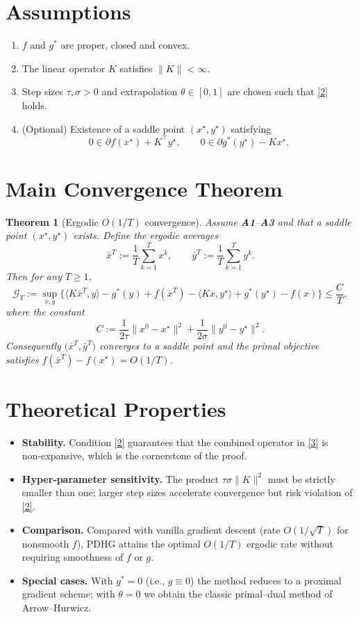 \documentclass{article}
\newtheorem{theorem}{Theorem}
\begin{document}
\section*{Assumptions}
\begin{enumerate}
\item[\textbf{A1}] $f$ and $g^{*}$ are proper, closed and convex.
\item[\textbf{A2}] The linear operator $K$ satisfies $\|K\|<\infty$.
\item[\textbf{A3}] Step sizes $\tau,\sigma>0$ and extrapolation $\theta\in[0,1]$ are chosen such that \eqref{2} holds.
\item[\textbf{A4}] (Optional) Existence of a saddle point $(x^{\star},y^{\star})$ satisfying
\[
0\in\partial f(x^{\star})+K^{\top}y^{\star},
\qquad
0\in\partial g^{*}(y^{\star})-Kx^{\star}.
\]
\end{enumerate}

\section*{Main Convergence Theorem}
\begin{theorem}[Ergodic $O(1/T)$ convergence]\label{thm:main}
Assume \textbf{A1}–\textbf{A3} and that a saddle point $(x^{\star},y^{\star})$ exists.  
Define the ergodic averages
\[
\bar x^{T}:=\frac{1}{T}\sum_{k=1}^{T}x^{k},
\qquad
\bar y^{T}:=\frac{1}{T}\sum_{k=1}^{T}y^{k}.
\]
Then for any $T\ge 1$,
\[
\mathcal G_{T}:=
\sup_{x,y}\Big\{\langle K\bar x^{T},y\rangle-g^{*}(y)+f(\bar x^{T})
          -\langle Kx,y^{\star}\rangle+g^{*}(y^{\star})-f(x)\Big\}
\le \frac{C}{T},
\tag{5}
\]
where the constant
\[
C:=\frac{1}{2\tau}\|x^{0}-x^{\star}\|^{2}
   +\frac{1}{2\sigma}\|y^{0}-y^{\star}\|^{2}.
\]
Consequently $\big(\bar x^{T},\bar y^{T}\big)$ converges to a saddle point and the primal objective satisfies $f(\bar x^{T})-f(x^{\star})=O(1/T)$.
\end{theorem}

\section*{Theoretical Properties}
\begin{itemize}
\item \textbf{Stability.} Condition \eqref{2} guarantees that the combined operator in \eqref{3} is non‑expansive, which is the cornerstone of the proof.
\item \textbf{Hyper‑parameter sensitivity.} The product $\tau\sigma\|K\|^{2}$ must be strictly smaller than one; larger step sizes accelerate convergence but risk violation of \eqref{2}.
\item \textbf{Comparison.} Compared with vanilla gradient descent (rate $O(1/\sqrt{T})$ for nonsmooth $f$), PDHG attains the optimal $O(1/T)$ ergodic rate without requiring smoothness of $f$ or $g$.
\item \textbf{Special cases.} With $g^{*}=0$ (i.e., $g\equiv0$) the method reduces to a proximal gradient scheme; with $\theta=0$ we obtain the classic primal–dual method of Arrow–Hurwicz.
\end{itemize}
\end{document}
